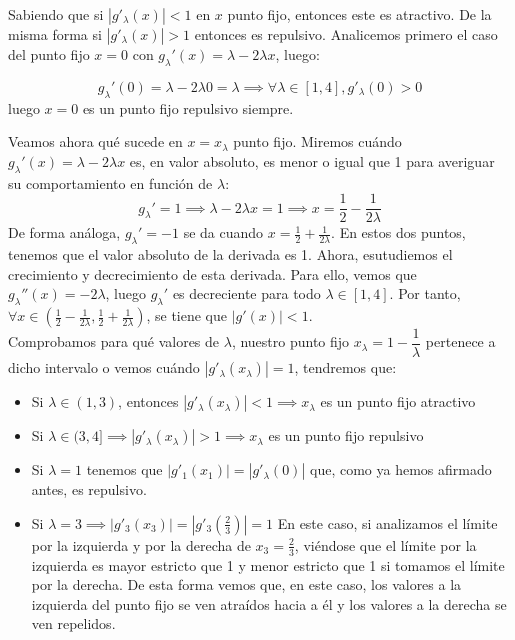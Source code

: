 \documentclass[11pt]{article}
\begin{document}
\begin{itemize}
\begin{comment}
Sabemos que la primera condición se verifica $\forall \lambda \in [0,4]$ por el primer apartado. La segunda condición se verifica si $|g_\lambda'(x)| \leq L < 1 \ \ \ \forall x \in [a,b]$.
\end{comment}
Sabiendo que si $|g'_\lambda(x)|<1$ en $x$ punto fijo, entonces este es atractivo. De la misma forma si $|g'_\lambda(x)|>1$ entonces es repulsivo. Analicemos primero el caso del punto fijo $x=0$ con $g_\lambda'(x)= \lambda - 2\lambda x$, luego:

\[g_\lambda'(0) = \lambda - 2\lambda 0=\lambda \implies \forall \lambda \in [1,4], g'_\lambda(0)>0\] luego $x=0$ es un punto fijo repulsivo siempre.

Veamos ahora qué sucede en $x=x_\lambda$ punto fijo. Miremos cuándo $g_\lambda'(x)= \lambda - 2\lambda x$ es, en valor absoluto, es menor o igual que 1 para averiguar su comportamiento en función de $\lambda$:
\[
g_\lambda ' = 1 \implies \lambda - 2\lambda x = 1 \implies x = \frac{1}{2} - \frac{1}{2\lambda}
\]
De forma análoga, $g_\lambda' = -1 $ se da cuando $x = \frac{1}{2} + \frac{1}{2\lambda}$.
	En estos dos puntos, tenemos que el valor absoluto de la derivada es 1. Ahora, esutudiemos el crecimiento y decrecimiento de esta derivada. Para ello, vemos que $g_\lambda''(x) = -2 \lambda$, luego $g_\lambda'$ es decreciente para todo $\lambda \in [1,4]$. Por tanto, $\forall x \in(\frac{1}{2}-\frac{1}{2\lambda},\frac{1}{2}+\frac{1}{2\lambda})$, se tiene que $|g'(x)| < 1$.\\


Comprobamos para qué valores de $\lambda$, nuestro punto fijo $x_\lambda = 1 - \dfrac{1}{\lambda}$ pertenece a dicho intervalo o vemos cuándo $|g'_\lambda(x_\lambda)| = 1$, tendremos que:
	
	\begin{itemize}
	\item Si $\lambda \in (1,3)$, entonces $|g'_\lambda(x_\lambda)| < 1 \implies x_\lambda$ es un punto fijo atractivo
	\item Si $\lambda \in(3,4] \implies |g'_\lambda(x_\lambda)| > 1 \implies x_\lambda$ es un punto fijo repulsivo
	\item Si $\lambda = 1$ tenemos que $|g'_1(x_1)|=|g'_\lambda(0)|$ que, como ya hemos afirmado antes, es repulsivo.
	\item Si $\lambda = 3 \implies |g'_3(x_3)|=|g'_3(\frac{2}{3})|=1$ En este caso, si analizamos el límite por la izquierda y por la derecha de $x_3=\frac{2}{3}$, viéndose que el límite por la izquierda es mayor estricto que 1 y menor estricto que 1 si tomamos el límite por la derecha. De esta forma vemos que, en este caso, los valores a la izquierda del punto fijo se ven atraídos hacia a él y los valores a la derecha se ven repelidos.
	
	\end{itemize}

\end{itemize}
 
\end{document}
